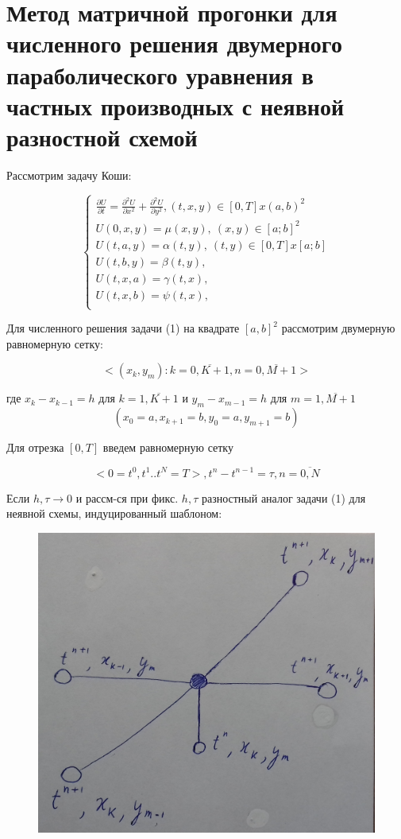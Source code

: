 \documentclass[__main__.tex]{subfiles}
\begin{document}
\section{Метод матричной прогонки для численного решения двумерного параболического уравнения в частных производных с неявной разностной схемой}

Рассмотрим задачу Коши:

\begin{equation} \label{50.1}
\begin{cases}
\frac{\partial U}{\partial t} = \frac{\partial^2 U}{\partial x^2} + \frac{\partial^2 U}{\partial y^2}, (t, x, y) \in [0, T] x (a, b)^2 \\
U(0,x,y) = \mu(x,y), \ (x,y)\in [a;b]^2 \\
U(t,a,y) = \alpha(t,y), \ (t,y)\in [0, T] x [a;b] \\
U(t,b,y) = \beta(t,y), \\
U(t,x,a) = \gamma(t,x), \\
U(t,x,b) = \psi(t,x), \\
\end{cases}
\end{equation}

Для численного решения задачи (1) на квадрате $[a,b]^2$ рассмотрим двумерную равномерную сетку:

\begin{equation}\label{50.2}
<(x_k, y_m): k = \overline{0,K+1}, n = \overline{0,M+1}>
\end{equation}

где $x_k-x_{k-1} = h$ для $k = \overline{1,K+1}$ и $y_m-x_{m-1} = h$ для $m = \overline{1,M+1}$
$$
(x_0 = a, x_{k+1} = b, y_0 = a, y_{m+1} = b)
$$

Для отрезка $[0, T]$ введем равномерную сетку 

\begin{equation}\label{50.3}
<0=t^0, t^1 .. t^N = T>, t^n - t^{n-1} = \tau, n = \overline{0,N}
\end{equation}

Если $h, \tau \rightarrow 0$ и рассм-ся при фикс. $h, \tau$ разностный аналог задачи (1) для неявной схемы, индуцированный шаблоном:

\begin{figure}[ht]
	\centering
	\includegraphics[width=0.4\linewidth]{img/img_50_1}
	\caption{}
	\label{img_50.1}
\end{figure}
\end{document}
